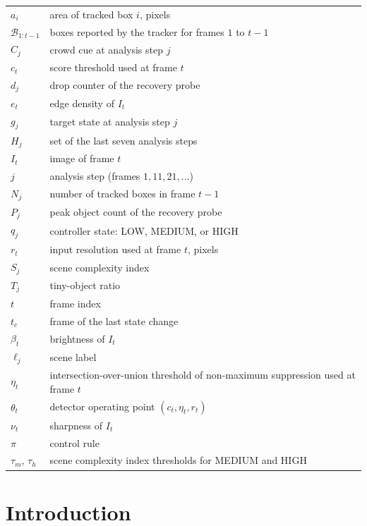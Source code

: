 \documentclass[journal]{new-aiaa}
\begin{document}
{\renewcommand\arraystretch{1.0}
\noindent\begin{longtable}{@{}l @{\quad=\quad} l@{}}
$a_i$ & area of tracked box $i$, pixels \\
$\mathcal{B}_{1:t-1}$ & boxes reported by the tracker for frames $1$ to $t-1$ \\
$C_j$ & crowd cue at analysis step $j$ \\
$c_t$ & score threshold used at frame $t$ \\
$d_j$ & drop counter of the recovery probe \\
$e_t$ & edge density of $I_t$ \\
$g_j$ & target state at analysis step $j$ \\
$H_j$ & set of the last seven analysis steps \\
$I_t$ & image of frame $t$ \\
$j$ & analysis step (frames $1, 11, 21, \dots$) \\
$N_j$ & number of tracked boxes in frame $t-1$ \\
$P_j$ & peak object count of the recovery probe \\
$q_j$ & controller state: LOW, MEDIUM, or HIGH \\
$r_t$ & input resolution used at frame $t$, pixels \\
$S_j$ & scene complexity index \\
$T_j$ & tiny-object ratio \\
$t$ & frame index \\
$t_c$ & frame of the last state change \\
$\beta_t$ & brightness of $I_t$ \\
$\ell_j$ & scene label \\
$\eta_t$ & intersection-over-union threshold of non-maximum suppression used at frame $t$ \\
$\theta_t$ & detector operating point $(c_t,\eta_t,r_t)$ \\
$\nu_t$ & sharpness of $I_t$ \\
$\pi$ & control rule \\
$\tau_m$, $\tau_h$ & scene complexity index thresholds for MEDIUM and HIGH \\
\end{longtable}}
\addtocounter{table}{-1}

\section{Introduction}\label{sec:intro}
\end{document}

